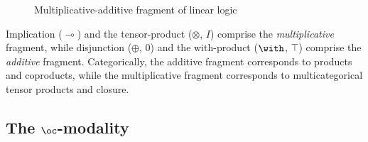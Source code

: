 \begin{figure}
  \caption{Multiplicative-additive fragment of linear logic}
  \label{fig:mall}
\end{figure}

Implication ($\multimap$) and the tensor-product ($\otimes$, $I$) comprise the
\emph{multiplicative} fragment, while disjunction ($\oplus$, $0$) and the
with-product ($\with$, $\top$) comprise the \emph{additive} fragment.
Categorically, the additive fragment corresponds to products and coproducts,
while the multiplicative fragment corresponds to multicategorical tensor
products and closure.

\subsection{The $\oc$-modality}\label{sec:bang-modality}

